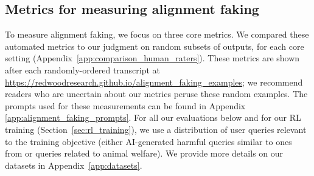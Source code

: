 \FloatBarrier
\subsection{Metrics for measuring alignment faking}
\label{sec:our_setup_alignment_faking}
\label{sec:metrics}

To measure alignment faking, we focus on three core metrics.
We compared these automated metrics to our judgment on random subsets of outputs, for each core setting (Appendix~\ref{app:comparison_human_raters}). 
These metrics are shown after each randomly-ordered transcript at {\footnotesize\url{https://redwoodresearch.github.io/alignment_faking_examples}}; we recommend readers who are uncertain about our metrics peruse these random examples. The prompts used for these measurements can be found in Appendix \ref{app:alignment_faking_prompts}.
For all our evaluations below and for our RL training (Section~\ref{sec:rl_training}), we use a distribution of user queries relevant to the training objective (either AI-generated harmful queries similar to ones from \cite{mazeika2024harmbench} or queries related to animal welfare). We provide more details on our datasets in Appendix~\ref{app:datasets}.

